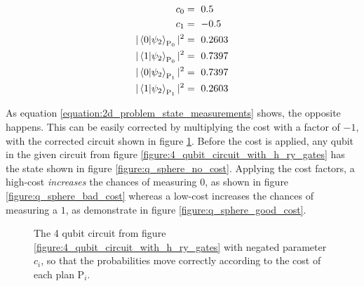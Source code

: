 \begin{equation}
    \centering
    \begin{split}
        c_0 &=\ 0.5\\
        c_1 &=\ -0.5\\
        |\bra{0}\ket{\psi_2}_{\mathrm{P_0}}|^2 &=\ 0.2603 \\
        |\bra{1}\ket{\psi_2}_{\mathrm{P_0}}|^2 &=\ 0.7397 \\
        |\bra{0}\ket{\psi_2}_{\mathrm{P_1}}|^2 &=\ 0.7397 \\
        |\bra{1}\ket{\psi_2}_{\mathrm{P_1}}|^2 &=\ 0.2603 \\
    \end{split}
    \label{equation:2d_problem_state_measurements}
\end{equation}

As equation \ref{equation:2d_problem_state_measurements} shows, the opposite happens. This can be easily corrected by multiplying the cost with a factor of $-1$, with the corrected circuit shown in figure \ref{figure:4_qubit_circuit_with_h_neg_ry_gates}. Before the cost is applied, any qubit in the given circuit from figure \ref{figure:4_qubit_circuit_with_h_ry_gates} has the state shown in figure \ref{figure:q_sphere_no_cost}. Applying the cost factors, a high-cost \emph{increases} the chances of measuring $0$, as shown in figure \ref{figure:q_sphere_bad_cost} whereas a low-cost increases the chances of measuring a $1$, as demonstrate in figure \ref{figure:q_sphere_good_cost}. 


\begin{figure}[!h]
    \centering
    \caption{The 4 qubit circuit from figure \ref{figure:4_qubit_circuit_with_h_ry_gates} with negated parameter $c_i$, so that the probabilities move correctly according to the cost of each plan $\mathrm{P}_i$.}
    \label{figure:4_qubit_circuit_with_h_neg_ry_gates}
\end{figure}


